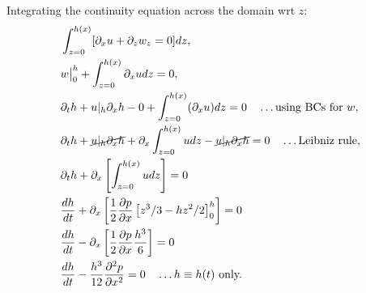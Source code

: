 \documentclass{article}
\begin{document}
Integrating the continuity equation across the domain wrt $z$:
\begin{align}\label{eq:integrate_conti}
\begin{split}
 &\int_{z=0}^{h(x)} [\partial_{x} u + \partial_{z} w_{z} = 0 ] dz,\\
 & w\big|_{0}^{h} + \int_{z=0}^{h(x)} \partial_{x} u dz = 0,\\
 & \partial_{t}h + u|_{h} \partial_{x}h - 0 +  \int_{z=0}^{h(x)} (\partial_{x} u )dz = 0 \quad \hdots \textrm{using BCs for } w, \\
 & \partial_{t}h + \cancel{u|_{h} \partial_{x}h} + \partial_{x} \int_{z=0}^{h(x)} u dz - \cancel{u|_{h} \partial_{x}h} = 0 \quad \hdots \textrm{Leibniz rule},\\
 & \partial_{t}h + \partial_{x}\left[\int_{z=0}^{h(x)} u dz\right] = 0\\
 &\frac{dh}{dt} + \partial_{x}\left[\frac{1}{2}\frac{\partial p}{\partial x}\left[z^{3}/3-hz^{2}/2 \right]_{0}^{h} \right] = 0\\
 &\frac{dh}{dt} - \partial_{x}\left[\frac{1}{2}\frac{\partial p}{\partial x}\frac{h^{3}}{6} \right] = 0\\
 &\frac{dh}{dt} -\frac{h^{3}}{12}\frac{\partial^{2}p}{\partial x^{2}} = 0 \quad \hdots h \equiv h(t) \textrm{ only.} 
\end{split}
\end{align}
\end{document}
